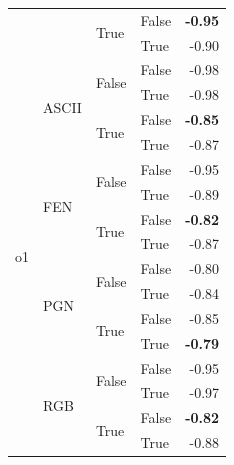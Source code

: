 \begin{tabular}{@{}llllr@{}}
                                    &                           & \multirow[c]{2}{*}{True}  & False                     & \textbf{-0.95} \\
                                    &                           &                           & True                      & -0.90 \\
    \midrule    
    \multirow[c]{17}{*}{o1}         & \multirow[c]{4}{*}{ASCII} & \multirow[c]{2}{*}{False} & False                     & -0.98 \\
                                    &                           &                           & True                      & -0.98 \\
                                    &                           & \multirow[c]{2}{*}{True}  & False                     & \textbf{-0.85} \\
                                    &                           &                           & True                      & -0.87 \\
    \cmidrule{2-5}
                                    & \multirow[c]{4}{*}{FEN}   & \multirow[c]{2}{*}{False} & False                     & -0.95 \\
                                    &                           &                           & True                      & -0.89 \\
                                    &                           & \multirow[c]{2}{*}{True}  & False                     & \textbf{-0.82} \\
                                    &                           &                           & True                      & -0.87 \\
    \cmidrule{2-5}
                                    & \multirow[c]{4}{*}{PGN}   & \multirow[c]{2}{*}{False} & False                     & -0.80 \\
                                    &                           &                           & True                      & -0.84 \\
                                    &                           & \multirow[c]{2}{*}{True}  & False                     & -0.85 \\
                                    &                           &                           & True                      & \textbf{-0.79} \\
    \cmidrule{2-5}
                                    & \multirow[c]{4}{*}{RGB}   & \multirow[c]{2}{*}{False} & False                     & -0.95 \\
                                    &                           &                           & True                      & -0.97 \\
                                    &                           & \multirow[c]{2}{*}{True}  & False                     & \textbf{-0.82} \\
                                    &                           &                           & True                      & -0.88 \\
   \bottomrule
\end{tabular}
